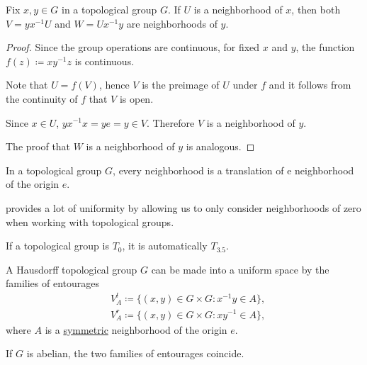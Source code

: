 \begin{Proposition}\label{thm:neighborhood_translations_in_topological_groups}
  Fix \( x, y \in G \) in a topological group \( G \). If \( U \) is a neighborhood of \( x \), then both \( V = yx^{-1} U \) and \( W = U x^{-1}y \) are neighborhoods of \( y \).
\end{Proposition}
\begin{proof}
  Since the group operations are continuous, for fixed \( x \) and \( y \), the function \( f(z) \coloneqq xy^{-1}z \) is continuous.

  Note that \( U = f(V) \), hence \( V \) is the preimage of \( U \) under \( f \) and it follows from the continuity of \( f \) that \( V \) is open.

  Since \( x \in U \), \( yx^{-1}x = ye = y \in V \). Therefore \( V \) is a neighborhood of \( y \).

  The proof that \( W \) is a neighborhood of \( y \) is analogous.
\end{proof}

\begin{Corollary}\label{thm:origin_neighborhoods_in_topological_groups}
  In a topological group \( G \), every neighborhood is a translation of e neighborhood of the origin \( e \).
\end{Corollary}

\begin{Remark}\label{remark:origin_neighborhoods_in_topological_groups}
   provides a lot of uniformity by allowing us to only consider neighborhoods of zero when working with topological groups.
\end{Remark}

\begin{Proposition}\label{thm:topological_group_t0_iff_t3.5}
  If a topological group is \( T_0 \), it is automatically \( T_{3.5} \).
\end{Proposition}

\begin{Proposition}\label{thm:topological_group_uniform_space}
  A Hausdorff topological group \( G \) can be made into a uniform space by the families of entourages
  \begin{align*}
    &V^l_A \coloneqq \{ (x, y) \in G \times G \colon x^{-1} y \in A \}, \\
    &V^r_A \coloneqq \{ (x, y) \in G \times G \colon x y^{-1} \in A \},
  \end{align*}
  where \( A \) is a \hyperref[def:neighborhood_set_types/symmetric]{symmetric} neighborhood of the origin \( e \).

  If \( G \) is abelian, the two families of entourages coincide.
\end{Proposition}

